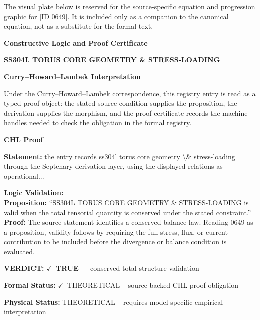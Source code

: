 \begingroup\footnotesize\sloppy
The visual plate below is reserved for the source-specific equation and progression graphic for [ID 0649]. It is included only as a companion to the canonical equation, not as a substitute for the formal text.
\par\endgroup
\ifTZPDarkEdition
{}
\fi

\clearpage
\begingroup\tzpsupportsetup
\noindent\textbf{\fontsize{10.8pt}{12.8pt}\selectfont [ID 0649] Constructive Logic and Proof Certificate}\par
\noindent\textbf{\fontsize{10pt}{12pt}\selectfont SS304L TORUS CORE GEOMETRY \& STRESS-LOADING}\par
\vspace{0.45em}
\begingroup
\footnotesize
\setlength{\parskip}{0.22em}
\setlength{\parindent}{0pt}
\noindent\textbf{Curry--Howard--Lambek Interpretation}\par
Under the Curry--Howard--Lambek correspondence, this registry entry is read as a typed proof
object: the stated source condition supplies the proposition, the derivation supplies the
morphism, and the proof certificate records the machine handles needed to check the obligation
in the formal registry.

\vspace{0.45em}
\noindent\textbf{CHL Proof}\par
\textbf{Statement:} the entry records ss304l torus core geometry \textbackslash{}\& stress-loading through the Septenary
derivation layer, using the displayed relations as operational...

\textbf{Logic Validation:}\\
\textbf{Proposition:} ``SS304L TORUS CORE GEOMETRY \& STRESS-LOADING is valid when the total tensorial quantity
is conserved under the stated constraint.''\\
\textbf{Proof:} The source statement identifies a conserved balance law. Reading 0649 as a proposition,
validity follows by requiring the full stress, flux, or current contribution to be
included before the divergence or balance condition is evaluated.

\textbf{VERDICT:} \ensuremath{\checkmark}\ \textbf{TRUE} --- conserved total-structure validation

\textbf{Formal Status:} \ensuremath{\checkmark}\ THEORETICAL -- source-backed CHL proof obligation

\textbf{Physical Status:} THEORETICAL -- requires model-specific empirical interpretation
\par\vspace{0.45em}
\par
\ifTZPDarkEdition
{}
\fi
\endgroup
\endgroup
